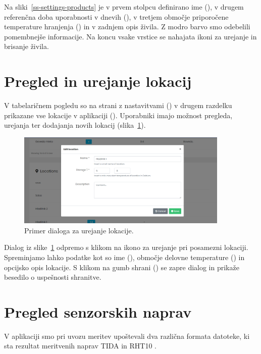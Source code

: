 \documentclass[a4paper, 12pt]{book}
\begin{document}
Na sliki~\ref{ss-settings-products} je v prvem stolpcu definirano ime (), v drugem referenčna doba uporabnosti v dnevih (), v tretjem območje priporočene temperature hranjenja () in v zadnjem opis živila. Z modro barvo smo odebelili pomembnejše informacije. Na koncu vsake vrstice se nahajata ikoni za urejanje in brisanje živila.



\section{Pregled in urejanje lokacij}

V tabelaričnem pogledu so na strani z nastavitvami () v drugem razdelku prikazane vse lokacije v aplikaciji (). Uporabniki imajo možnost pregleda, urejanja ter dodajanja novih lokacij (slika~\ref{ss-settings-location}).


\begin{figure}[h]
\begin{center}
\includegraphics[width=0.9\textwidth]{slike/location_edit.png}
\end{center}
\caption{Primer dialoga za urejanje lokacije.}
\label{ss-settings-location}
\end{figure}

Dialog iz slike~\ref{ss-settings-location} odpremo s klikom na ikono za urejanje pri posamezni lokaciji. Spreminjamo lahko podatke kot so ime (), območje delovne temperature () in opcijsko opis lokacije. S klikom na gumb shrani () se zapre dialog in prikaže besedilo o uspešnosti shranitve.


\clearpage


\section{Pregled senzorskih naprav}

V aplikaciji smo pri uvozu meritev upoštevali dva različna formata datoteke, ki sta rezultat meritvenih naprav TIDA \cite{dialoger-tida} in RHT10 \cite{rht10-dialogger}.
\end{document}
